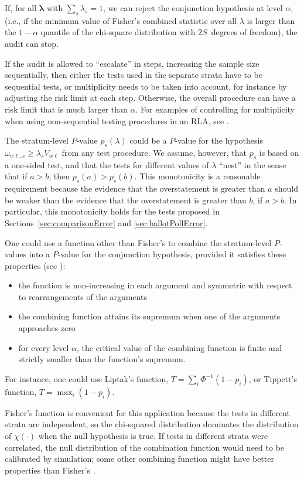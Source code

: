 \documentclass[runningheads]{llncs}
\begin{document}
If, for all $\mathbf{\lambda}$ with $\sum_s \lambda_s = 1$, we can reject the conjunction
hypothesis at level $\alpha$, 
(i.e., if the minimum value of Fisher's combined statistic over all $\lambda$ is larger than the $1-\alpha$ quantile of the chi-square
distribution with $2S$~degrees of freedom), the audit can stop. 

If the audit is allowed to ``escalate'' in steps, increasing the sample size sequentially, then either the tests used in the separate strata have to be sequential tests, or multiplicity needs to be taken into account, for instance by adjusting the risk limit at each step.
Otherwise, the overall procedure can have a risk limit that is much larger than $\alpha$.
For examples of controlling for multiplicity when using non-sequential testing procedures in an RLA, see \cite{stark08a,stark09a}.

The stratum-level $P$-value $p_s(\lambda)$ could be a $P$-value for the hypothesis
$\omega_{w\ell,s} \ge \lambda_s V_{w\ell}$ from any test procedure. 
We assume, however, that $p_s$ is based on a one-sided test, and that the tests
for different values of $\lambda$ ``nest'' in the sense that if $a > b$,
then $p_s(a) > p_s(b)$.
This monotonicity is a reasonable requirement because the evidence that the overstatement
is greater than $a$ should be weaker than the evidence that the overstatement is greater than
$b$, if $a > b$.
In particular, this monotonicity holds for the tests proposed in Sections~\ref{sec:comparisonError}
and \ref{sec:ballotPollError}.

One could use a function other than Fisher's to combine the stratum-level $P$-values into a $P$-value for the conjunction hypothesis, provided it satisfies these properties (see \cite{pesarinSalmaso10}):
\begin{itemize}
  \item the function is non-increasing in each argument and symmetric with respect to rearrangements of the arguments
  \item the combining function attains its supremum when one of the arguments approaches zero
  \item for every level $\alpha$, the critical value of the combining function is finite and strictly smaller than the function's supremum.
\end{itemize}
For instance, one could use Liptak's function, $T = \sum_i \Phi^{-1}(1-p_i)$,
or Tippett's function, $T = \max_i (1-p_i)$.

Fisher's function is convenient for this application because the tests in different strata are independent, so the chi-squared distribution dominates the distribution of $\chi(\cdot)$ when the null hypothesis is true.
If tests in different strata were correlated, the null distribution of the combination function would need to be calibrated by simulation; some other combining function might have better properties than Fisher's \cite{pesarinSalmaso10}.
\end{document}
